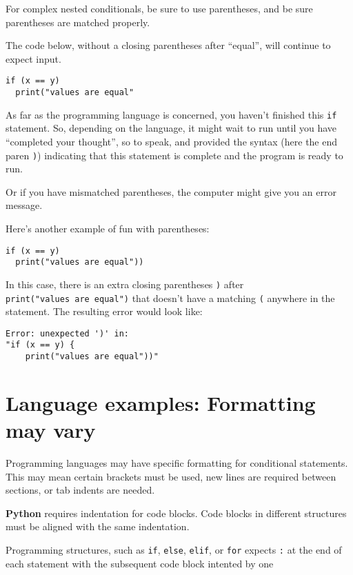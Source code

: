 \documentclass[
]{book}
\begin{document}
For complex nested conditionals, be sure to use parentheses, and be sure parentheses are matched properly.

The code below, without a closing parentheses after ``equal'', will continue to expect input.

\begin{verbatim}
if (x == y) 
  print("values are equal"
\end{verbatim}

As far as the programming language is concerned, you haven't finished this \texttt{if} statement. So, depending on the language, it might wait to run until you have ``completed your thought'', so to speak, and provided the syntax (here the end paren \texttt{)}) indicating that this statement is complete and the program is ready to run.

Or if you have mismatched parentheses, the computer might give you an error message.

Here's another example of fun with parentheses:

\begin{verbatim}
if (x == y) 
  print("values are equal"))
\end{verbatim}

In this case, there is an extra closing parentheses \texttt{)} after \texttt{print("values\ are\ equal")} that doesn't have a matching \texttt{(} anywhere in the statement. The resulting error would look like:

\begin{verbatim}
Error: unexpected ')' in:
"if (x == y) {
    print("values are equal"))"
\end{verbatim}

\section{Language examples: Formatting may vary}\label{language-examples-formatting-may-vary}

Programming languages may have specific formatting for conditional statements. This may mean certain brackets must be used, new lines are required between sections, or tab indents are needed.

\textbf{Python} requires indentation for code blocks. Code blocks in different structures must be aligned with the same indentation.

Programming structures, such as \texttt{if}, \texttt{else}, \texttt{elif}, or \texttt{for} expects \texttt{:} at the end of each statement with the subsequent code block intented by one
\end{document}
